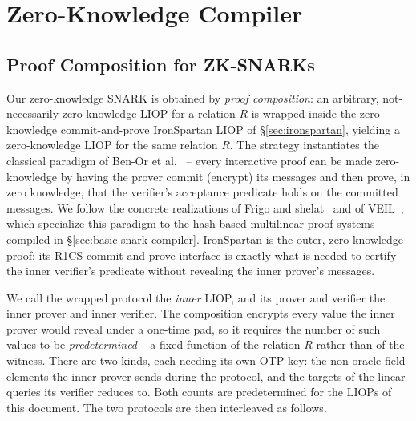 \documentclass{article}
\theoremstyle{definition}
\begin{document}
\section{Zero-Knowledge Compiler}
\label{sec:zk-compiler}

\subsection{Proof Composition for ZK-SNARKs}
\label{sec:proof-composition}

Our zero-knowledge SNARK is obtained by \emph{proof composition}: an arbitrary, not-necessarily-zero-knowledge LIOP for a relation $R$ is wrapped inside the zero-knowledge commit-and-prove IronSpartan LIOP of \S\ref{sec:ironspartan}, yielding a zero-knowledge LIOP for the same relation $R$. The strategy instantiates the classical paradigm of Ben-Or et al.~\cite{10.5555/88314.88333} -- every interactive proof can be made zero-knowledge by having the prover commit (encrypt) its messages and then prove, in zero knowledge, that the verifier's acceptance predicate holds on the committed messages. We follow the concrete realizations of Frigo and shelat~\cite{Frigo:2024aa} and of VEIL~\cite{cryptoeprint:2026/683}, which specialize this paradigm to the hash-based multilinear proof systems compiled in \S\ref{sec:basic-snark-compiler}. IronSpartan is the outer, zero-knowledge proof: its R1CS commit-and-prove interface is exactly what is needed to certify the inner verifier's predicate without revealing the inner prover's messages.

We call the wrapped protocol the \emph{inner} LIOP, and its prover and verifier the inner prover and inner verifier. The composition encrypts every value the inner prover would reveal under a one-time pad, so it requires the number of such values to be \emph{predetermined} -- a fixed function of the relation $R$ rather than of the witness. There are two kinds, each needing its own OTP key: the non-oracle field elements the inner prover sends during the protocol, and the targets of the linear queries its verifier reduces to. Both counts are predetermined for the LIOPs of this document. The two protocols are then interleaved as follows.
\end{document}

